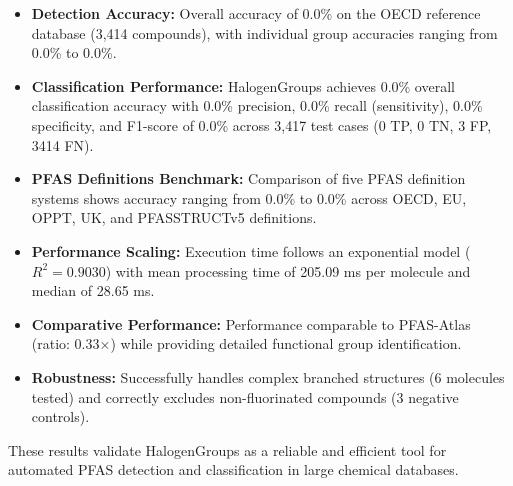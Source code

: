 \begin{itemize}
\item \textbf{Detection Accuracy:} Overall accuracy of 0.0\% on the OECD reference database (3,414 compounds), with individual group accuracies ranging from 0.0\% to 0.0\%.

\item \textbf{Classification Performance:} HalogenGroups achieves 0.0\% overall classification accuracy with 0.0\% precision, 0.0\% recall (sensitivity), 0.0\% specificity, and F1-score of 0.0\% across 3,417 test cases (0 TP, 0 TN, 3 FP, 3414 FN).

\item \textbf{PFAS Definitions Benchmark:} Comparison of five PFAS definition systems shows accuracy ranging from 0.0\% to 0.0\% across OECD, EU, OPPT, UK, and PFASSTRUCTv5 definitions.

\item \textbf{Performance Scaling:} Execution time follows an exponential model ($R^2 = 0.9030$) with mean processing time of 205.09 ms per molecule and median of 28.65 ms.

\item \textbf{Comparative Performance:} Performance comparable to PFAS-Atlas (ratio: 0.33$\times$) while providing detailed functional group identification.

\item \textbf{Robustness:} Successfully handles complex branched structures (6 molecules tested) and correctly excludes non-fluorinated compounds (3 negative controls).
\end{itemize}

These results validate HalogenGroups as a reliable and efficient tool for automated PFAS detection and classification in large chemical databases.

